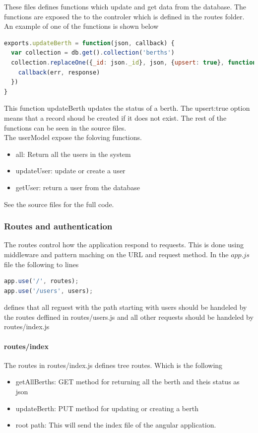 \documentclass[a4paper,12pt,english]{article}
\begin{document}
These files defines functions which update and get data from the database. The functions are exposed the to the controler which is defined in the routes folder. An example of one of the functions is shown below


\begin{lstlisting}[language=javascript]
exports.updateBerth = function(json, callback) {
  var collection = db.get().collection('berths')
  collection.replaceOne({_id: json._id}, json, {upsert: true}, function(err, response) {
    callback(err, response)
  })
}
\end{lstlisting}
This function updateBerth updates the status of a berth. The {upsert:true} option means that a record shoud be created if it does not exist.
The rest of the functions can be seen in the source files.
\\
The userModel expose the foloving functions.
\begin{itemize}
\item all: Return all the users in the system
\item updateUser: update or create a user
\item getUser: return a user from the database
\end{itemize}

See the source files for the full code.

\subsubsection{Routes and authentication}
The routes control how the application respond to requests. This is done using middleware and pattern maching on the URL and request method.
In the $app.js$ file the following to lines 
\begin{lstlisting}[language=javascript] 
app.use('/', routes);
app.use('/users', users);
\end{lstlisting}
defines that all reguest with the path starting with users should be handeled by the routes deffined in routes/users.js and all other requests should be handeled by routes/index.js

\paragraph{routes/index}
The routes in routes/index.js defines tree routes. Which is the following

\begin{itemize}
\item getAllBerths: GET method for returning all the berth and theis status as json
\item updateBerth: PUT method for updating or creating a berth 
\item root path: This will send the index file of the angular application.
\end{itemize}
\end{document}

